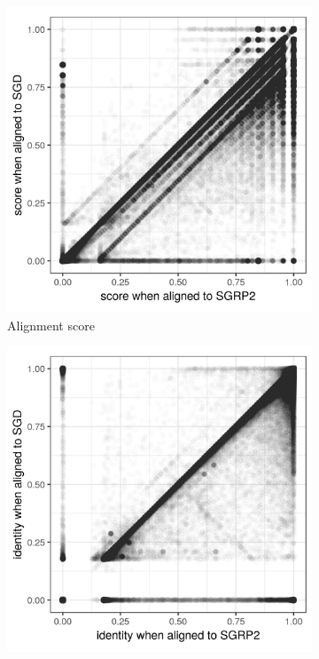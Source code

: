 \documentclass[a4paper,12pt,numbered,oneside]{Classes/PhDThesisPSnPDF}
\begin{document}
\begin{figure}[htbp!]
  \centering
  \begin{subfigure}[t]{0.49\textwidth}
    \includegraphics[width=1.0\textwidth]{Chapter3/Figs/NCYC_SGRP2_SGD_comparison_score.png}
    \caption{Alignment score} \label{subfig:NCYC_score}
  \end{subfigure}
  \begin{subfigure}[t]{0.49\textwidth}
    \includegraphics[width=1.0\textwidth]{Chapter3/Figs/NCYC_SGRP2_SGD_comparison_id.png}

\end{subfigure}
\end{figure}
\end{document}
